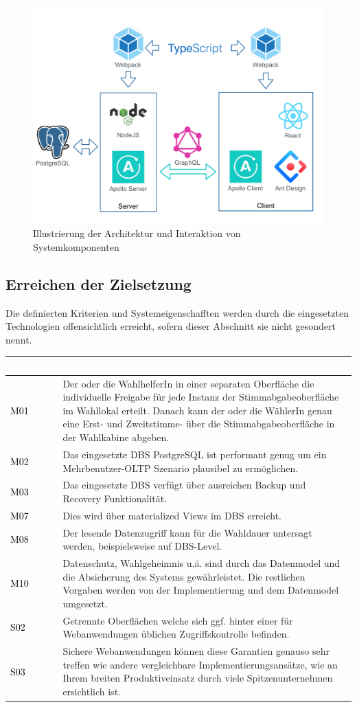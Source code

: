 \documentclass[a4paper,12pt]{article}
\newcommand\addrow[2]{\textcolor{black}{#1} &#2\\ \hline}
\newcommand\addheading[2]{\rowcolor{TUMBlue}\textcolor{white}{#1} & \textcolor{white}{#2}\\ \hline}
\newcommand\tabularhead{\begin{tabular}{|b|p{13cm}|}
\hline
}
\newenvironment{usecase}{\tabularhead}
{\hline\end{tabular}}
\begin{document}
\begin{figure}[h!]
      \centering
      \includegraphics[width=\textwidth]{architecture.pdf}
      \caption{Illustrierung der Architektur und Interaktion von Systemkomponenten}
      \label{fig:architecture}
\end{figure}

\clearpage

\subsection{Erreichen der Zielsetzung}
Die definierten Kriterien und Systemeigenschafften werden durch die eingesetzten Technologien 
offensichtlich erreicht, sofern dieser Abschnitt sie nicht gesondert nennt.

\begin{usecase}
	\addheading{Nummer}{Zielsetzung wird erreicht, weil:} 
      \addrow{M01}{Der oder die WahlhelferIn in einer separaten Oberfläche die individuelle Freigabe für jede Instanz der Stimmabgabeoberfläche im Wahllokal erteilt. Danach kann der oder die WählerIn genau eine Erst- und Zweitstimme- über die Stimmabgabeoberfläche in der Wahlkabine abgeben.}
      \addrow{M02}{Das eingesetzte DBS PostgreSQL ist performant genug um ein Mehrbenutzer-OLTP Szenario plausibel zu ermöglichen.}
      \addrow{M03}{Das eingesetzte DBS verfügt über ausreichen Backup und Recovery Funktionalität.}
	\addrow{M07}{Dies wird über materialized Views im DBS erreicht.}
	\addrow{M08}{Der lesende Datenzugriff kann für die Wahldauer untersagt werden, beispielsweise auf DBS-Level.}
      \addrow{M10}{Datenschutz, Wahlgeheimnis u.ä. sind durch das Datenmodel und die Absicherung des Systems gewährleistet. Die restlichen Vorgaben werden von der Implementierung und dem Datenmodel umgesetzt.}
      \addrow{S02}{Getrennte Oberflächen welche sich ggf. hinter einer für Webanwendungen üblichen Zugriffskontrolle befinden.}
      \addrow{S03}{Sichere Webanwendungen können diese Garantien genauso sehr treffen wie andere vergleichbare Implementierungsansätze, wie an Ihrem breiten Produktiveinsatz durch viele Spitzenunternehmen ersichtlich ist.}
\end{usecase}
\end{document}
